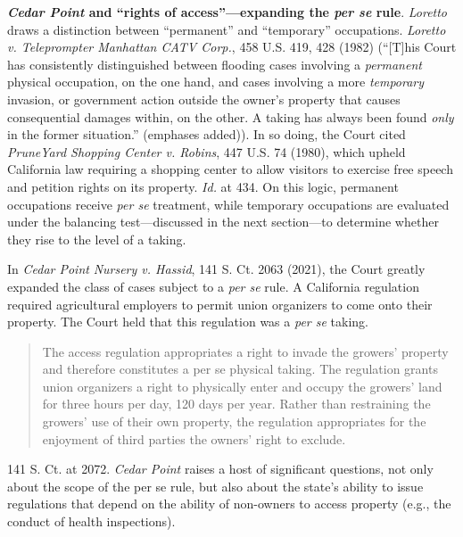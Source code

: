 \item \textbf{\textit{Cedar Point} and ``rights of access''---expanding
the \textit{per se} rule}. \textit{Loretto} draws a
distinction between ``permanent'' and ``temporary'' occupations. \emph{Loretto
v. Teleprompter Manhattan CATV Corp.}, 458 U.S. 419, 428 (1982) (``[T]his Court
has consistently distinguished between flooding cases involving a
\textit{permanent} physical occupation, on the one hand, and cases involving a
more \textit{temporary} invasion, or government action outside the owner's
property that causes consequential damages within, on the other. A taking has
always been found \textit{only} in the former situation.'' (emphases added)). In
so doing, the Court cited \textit{PruneYard Shopping Center v. Robins}, 447 U.S.
74 (1980), which upheld California law requiring a shopping center to allow
visitors to exercise free speech and petition rights on its property.
\textit{Id.} at 434. On this logic, permanent occupations receive \textit{per
se} treatment, while temporary occupations are evaluated under the balancing
test---discussed in the next section---to determine whether they rise to the
level of a taking.

In \textit{Cedar Point} \textit{Nursery v. Hassid}, 141 S. Ct. 2063
(2021), the Court greatly expanded the class of cases subject to a \textit{per
se} rule. A California regulation required agricultural employers to permit
union organizers to come onto their property. The Court held that this
regulation was a \textit{per se} taking. 
\begin{quote}
The access regulation appropriates a right to invade the growers' property and
therefore constitutes a per se physical taking. The regulation grants union
organizers a right to physically enter and occupy the growers' land for three
hours per day, 120 days per year. Rather than restraining the growers' use of
their own property, the regulation appropriates for the enjoyment of third
parties the owners' right to exclude.
\end{quote}
141 S. Ct. at 2072. \textit{Cedar Point} raises a host of significant
questions, not only about the scope of the per se rule, but also about the
state's ability to issue regulations that depend on the ability of non-owners to
access property (e.g., the conduct of health inspections).

